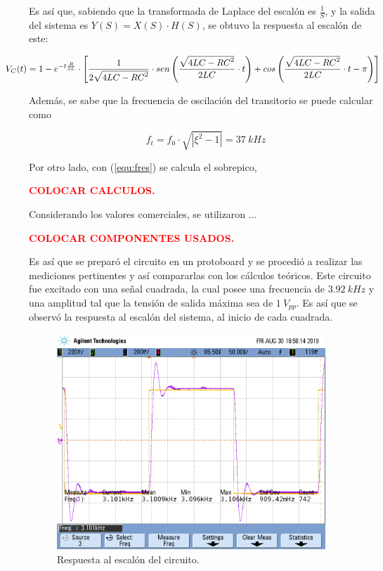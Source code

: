 \documentclass[11pt, a4paper]{article}
\begin{document}
Es así que, sabiendo que la transformada de Laplace del escalón es $\frac{1}{S}$, y la salida del sistema es $Y(S) = X(S) \cdot H(S)$, se obtuvo la respuesta al escalón de este:

\begin{equation} \hspace*{-1cm}
	V_{C}(t) = 1 - e^{-t \frac{R}{2L}} \cdot \left[\frac{1}{2 \sqrt{4LC - {RC}^2}} \cdot sen \left( \frac{\sqrt{4LC - {RC}^2}}{2LC} \cdot t \right) + cos \left( \frac{\sqrt{4LC - {RC}^2}}{2LC} \cdot t - \pi \right) \right]
\end{equation} 

Además, se sabe que la frecuencia de oscilación del transitorio se puede calcular como

\begin{equation}
	f_t = f_0 \cdot \sqrt{|\xi^2 - 1|} = 37 \ kHz
	\label{equ:fres}
\end{equation}

Por otro lado, con (\ref{equ:fres}) se calcula el sobrepico,

\begin{center}
	\textcolor{red}{\textbf{COLOCAR CALCULOS.}}
\end{center}

Considerando los valores comerciales, se utilizaron ...

\begin{center}
	\textcolor{red}{\textbf{COLOCAR COMPONENTES USADOS.}}
\end{center}

Es así que se preparó el circuito en un protoboard y se procedió a realizar las mediciones pertinentes y así compararlas con los cálculos teóricos. Este circuito fue excitado con una señal cuadrada, la cual posee una frecuencia de $3.92 \ kHz$ y una amplitud tal que la tensión de salida máxima sea de $1 \ V_{pp}$. Es así que se observó la respuesta al escalón del sistema, al inicio de cada cuadrada.

\begin{figure}[H]
	\centering
	\includegraphics[width=0.9\textwidth, trim = {0 3.4cm 0.4cm 2cm},clip]{Ejercicio2/Mediciones/A/scope_0.png}
\caption{Respuesta al escalón del circuito.}
	\label{fig:rtaescalon}
\end{figure}
\end{document}
